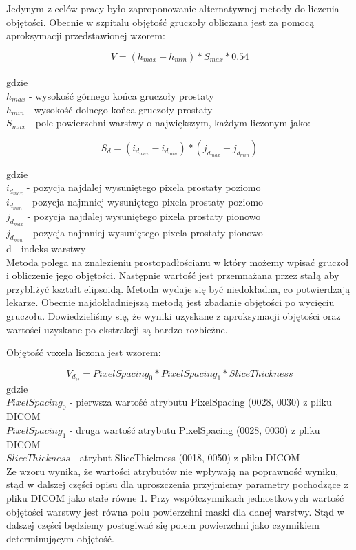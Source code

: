 \documentclass[a4paper,11pt,twoside]{report}
\theoremstyle{definition}
\begin{document}
Jedynym z celów pracy było zaproponowanie alternatywnej metody do liczenia objętości. Obecnie w szpitalu objętość gruczoły obliczana jest za pomocą aproksymacji przedstawionej wzorem:

\[V = (h_{max} - h_{min}) * S_{max} * 0.54\]
\\
gdzie 
\\
\(h_{max}\) - wysokość górnego końca gruczoły prostaty                     
\\
\(h_{min}\) - wysokość dolnego końca gruczoły prostaty                     
\\
\(S_{max}\) - pole powierzchni warstwy o największym, każdym liczonym jako:  

\[S_d = (i_{d_{max}} - i_{d_{min}}) * (j_{d_{max}} - j_{d_{min}})\] 

gdzie \\
\(i_{d_{max}}\) - pozycja najdalej wysuniętego pixela prostaty poziomo \\
\(i_{d_{min}}\) - pozycja najmniej wysuniętego pixela prostaty poziomo \\
\(j_{d_{max}}\) - pozycja najdalej wysuniętego pixela prostaty pionowo \\
\(j_{d_{min}}\) - pozycja najmniej wysuniętego pixela prostaty pionowo \\
d - indeks warstwy \\

Metoda polega na znalezieniu prostopadłościanu w który możemy wpisać gruczoł i obliczenie jego objętości. Następnie wartość jest przemnażana przez stałą aby przybliżyć kształt elipsoidą. Metoda wydaje się być niedokładna, co potwierdzają lekarze. Obecnie najdokładniejszą metodą jest zbadanie objętości po wycięciu gruczołu. Dowiedzieliśmy się, że wyniki uzyskane z aproksymacji objętości oraz wartości uzyskane po ekstrakcji są bardzo rozbieżne. 


Objętość voxela liczona jest wzorem:

\[ V_{d_{ij}} = PixelSpacing_0 * PixelSpacing_1 * SliceThickness\]
gdzie \\
\(PixelSpacing_0\) - pierwsza wartość atrybutu PixelSpacing (0028, 0030) z pliku DICOM \\
\(PixelSpacing_1\)  - druga wartość atrybutu PixelSpacing (0028, 0030) z pliku DICOM \\
\(SliceThickness\) - atrybut SliceThickness (0018, 0050) z pliku DICOM \\

Ze wzoru wynika, że wartości atrybutów nie wpływają na poprawność wyniku, stąd w dalszej części opisu dla uproszczenia przyjmiemy parametry pochodzące z pliku DICOM jako stałe równe 1. Przy współczynnikach jednostkowych wartość objętości warstwy jest równa polu powierzchni maski dla danej warstwy. Stąd w dalszej części będziemy posługiwać się polem powierzchni jako czynnikiem determinującym objętość.
\end{document}
